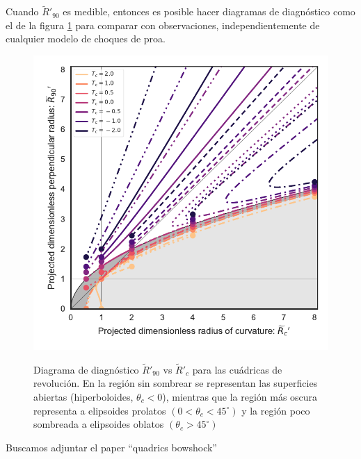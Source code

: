 Cuando $\tilde{R}'_{90}$ es medible, entonces es posible hacer diagramas de diagnóstico como
el de la figura \ref{fig:diagnostic} para comparar con observaciones, independientemente de
cualquier modelo de choques de proa.

\begin{figure}
  \includegraphics[width=0.5\linewidth]{./Figures/projected-R90-vs-Rc}
  \label{fig:diagnostic}
  \caption{Diagrama de diagnóstico $\tilde{R}'_{90}$ vs $\tilde{R}'_c$ para las cuádricas
    de revolución. En la región sin sombrear se representan las superficies abiertas
    (hiperboloides, $\theta_c <0$), mientras que la región más oscura representa  a
    elipsoides prolatos  $(0 < \theta_c < 45^\circ)$ y la región poco sombreada a
    elipsoides oblatos $(\theta_c > 45^\circ)$}
\end{figure}

Buscamos adjuntar el paper ``quadrics bowshock''
